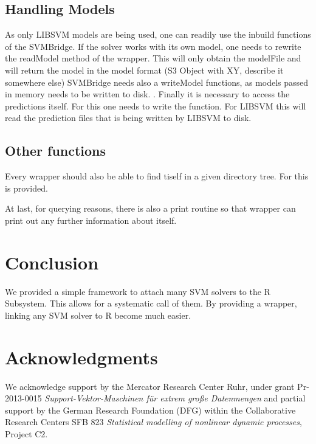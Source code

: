 \documentclass[article, shortnames]{jss}
\begin{document}
\subsection{Handling Models}

As only LIBSVM models are being used, one can readily use the 
inbuild functions of the SVMBridge. If the solver works with its
own model, one needs to rewrite the readModel method of the wrapper.
This will only obtain the modelFile and will return the model
in the model format (S3 Object with XY, describe it somewhere else)
SVMBridge needs also a writeModel functions, as models passed in
memory needs to be written to disk. .
Finally it is necessary to access the predictions itself. For this one
needs to write the  function. For LIBSVM this
will read the prediction files that is being written by LIBSVM to disk.


\subsection{Other functions}

Every wrapper should also be able to find tiself in a given directory tree.
For this  is provided.

At last, for querying reasons, there is also a print routine
so that wrapper can print out any further information about itself.


\section{Conclusion}

We provided a simple framework to attach many SVM solvers to the R Subsystem.
This allows for a systematic call of them.
By providing a wrapper, linking any SVM solver to R become much easier.



\section*{Acknowledgments}

We acknowledge support by the Mercator Research Center Ruhr,
under grant Pr-2013-0015 \textit{Support-Vektor-Maschinen f{\"u}r extrem gro{\ss}e Datenmengen} and
partial support by the German Research Foundation (DFG) within the Collaborative Research Centers SFB 823
\textit{Statistical modelling of nonlinear dynamic processes}, Project C2.



\end{document}
